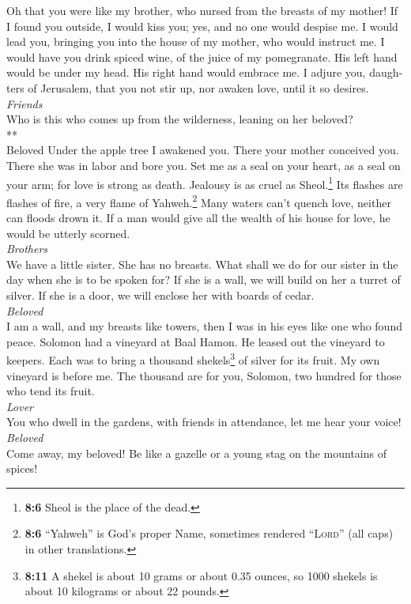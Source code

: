 \begin{paracol}{2}
\begin{otherlanguage}{english}
 Oh that you were like my brother, who nursed from the
breasts of my mother! If I found you outside, I would kiss you; yes, and
no one would despise me.  I would lead you, bringing you
into the house of my mother, who would instruct me. I would have you
drink spiced wine, of the juice of my pomegranate.  His
left hand would be under my head. His right hand would embrace me.
 I adjure you, daughters of Jerusalem, that you not stir
up, nor awaken love, until it so desires.\\
\emph{Friends }\\
 Who is this who comes up from the wilderness, leaning on
her beloved?\\
**\\
Beloved Under the apple tree I awakened you. There your mother conceived
you. There she was in labor and bore you.  Set me as a
seal on your heart, as a seal on your arm; for love is strong as death.
Jealousy is as cruel as Sheol.\footnote{\textbf{8:6} Sheol is the place
  of the dead.} Its flashes are flashes of fire, a very flame of
Yahweh.\footnote{\textbf{8:6} ``Yahweh'' is God's proper Name, sometimes
  rendered ``\textsc{Lord}'' (all caps) in other translations.}
 Many waters can't quench love, neither can floods drown
it. If a man would give all the wealth of his house for love, he would
be utterly scorned.\\
\emph{Brothers }\\
 We have a little sister. She has no breasts. What shall
we do for our sister in the day when she is to be spoken for?
 If she is a wall, we will build on her a turret of
silver. If she is a door, we will enclose her with boards of cedar.\\
\emph{Beloved }\\
 I am a wall, and my breasts like towers, then I was in
his eyes like one who found peace.  Solomon had a
vineyard at Baal Hamon. He leased out the vineyard to keepers. Each was
to bring a thousand shekels\footnote{\textbf{8:11} A shekel is about 10
  grams or about 0.35 ounces, so 1000 shekels is about 10 kilograms or
  about 22 pounds.} of silver for its fruit.  My own
vineyard is before me. The thousand are for you, Solomon, two hundred
for those who tend its fruit.\\
\emph{Lover }\\
 You who dwell in the gardens, with friends in
attendance, let me hear your voice!\\
\emph{Beloved }\\
 Come away, my beloved! Be like a gazelle or a young stag
on the mountains of spices! \end{otherlanguage}
\end{paracol}
